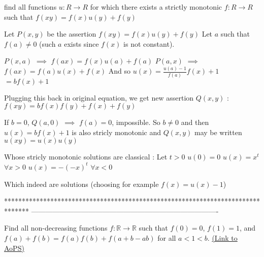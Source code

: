 \begin{solution}
	\begin{tcolorbox}find all functions $u:R\to R$ for which there exists a strictly monotonic $f:R\to R$ such that $f(xy)=f(x)u(y)+f(y)$\end{tcolorbox}
Let $P(x,y)$ be the assertion $f(xy)=f(x)u(y)+f(y)$
Let $a$ such that $f(a)\ne 0$ (such $a$ exists since $f(x)$ is not constant).

$P(x,a)$ $\implies$ $f(ax)=f(x)u(a)+f(a)$
$P(a,x)$ $\implies$ $f(ax)=f(a)u(x)+f(x)$
And so $u(x)=\frac{u(a)-1}{f(a)}f(x)+1$ $=bf(x)+1$

Plugging this back in original equation, we get new assertion $Q(x,y)$ : $f(xy)=bf(x)f(y)+f(x)+f(y)$

If $b=0$, $Q(a,0)$ $\implies$ $f(a)=0$, impossible.
So $b\ne 0$ and then $u(x)=bf(x)+1$ is also stricly monotonic and $Q(x,y)$ may be written $u(xy)=u(x)u(y)$

Whose stricly monotonic solutions are classical :
Let $t>0$
$u(0)=0$
$u(x)=x^t$ $\forall x>0$
$u(x)=-(-x)^t$ $\forall x<0$

Which indeed are solutions (choosing for example $f(x)=u(x)-1$)
\end{solution}
*******************************************************************************
-------------------------------------------------------------------------------

\begin{problem}
	Find all non-decreasing functions $f: \mathbb{R} \to \mathbb{R}$ such that $f(0)=0$, $f(1)=1$, and $f(a)+f(b)=f(a)f(b)+f(a+b-ab)$ for all $a<1<b$.
	\flushright \href{https://artofproblemsolving.com/community/c6h466326}{(Link to AoPS)}
\end{problem}



